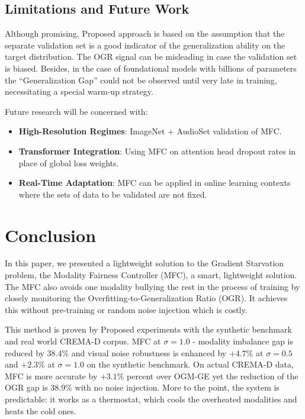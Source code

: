\documentclass{ieeeaccess}
\begin{document}
\subsection{Limitations and Future Work}
Although promising, Proposed approach is based on the assumption that the separate validation set is a good indicator of the generalization ability on the target distribution. The OGR signal can be misleading in case the validation set is biased. Besides, in the case of foundational models with billions of parameters the ``Generalization Gap'' could not be observed until very late in training, necessitating a special warm-up strategy.

Future research will be concerned with:
\begin{itemize}
    \item \textbf{High-Resolution Regimes}: ImageNet + AudioSet \cite{gemmeke2017audio} validation of MFC.
    \item \textbf{Transformer Integration}: Using MFC on attention head dropout rates in place of global loss weights.
    \item \textbf{Real-Time Adaptation}: MFC can be applied in online learning contexts where the sets of data to be validated are not fixed.
\end{itemize}

\section{Conclusion}
In this paper, we presented a lightweight solution to the Gradient Starvation problem, the Modality Fairness Controller (MFC), a smart, lightweight solution. The MFC also avoids one modality bullying the rest in the process of training by closely monitoring the Overfitting-to-Generalization Ratio (OGR). It achieves this without pre-training or random noise injection which is costly.

This method is proven by Proposed experiments with the synthetic benchmark and real world CREMA-D corpus. MFC at $\sigma{=}1.0$ - modality imbalance gap is reduced by 38.4\% and visual noise robustness is enhanced by $+4.7\%$ at $\sigma{=}0.5$ and $+2.3\%$ at $\sigma{=}1.0$ on the synthetic benchmark. On actual CREMA-D data, MFC is more accurate by $+3.1\%$ percent over OGM-GE yet the reduction of the OGR gap is 38.9\% with no noise injection. More to the point, the system is predictable: it works as a thermostat, which cools the overheated modalities and heats the cold ones.
	
\end{document}
